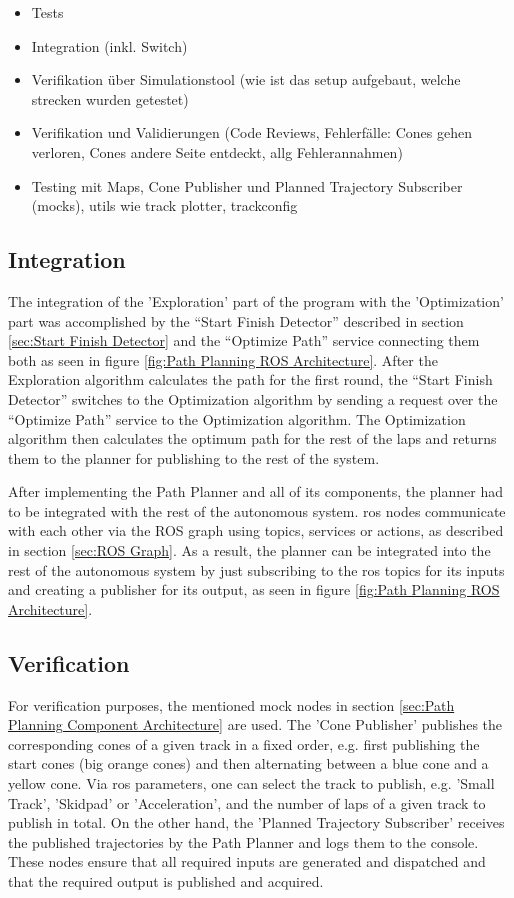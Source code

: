 \begin{itemize}
    \item Tests
    \item Integration (inkl. Switch)
    \item Verifikation über Simulationstool (wie ist das setup aufgebaut, welche strecken wurden getestet)
    \item Verifikation und Validierungen (Code Reviews, Fehlerfälle: Cones gehen verloren, Cones andere Seite entdeckt, allg Fehlerannahmen)
    \item Testing mit Maps, Cone Publisher und Planned Trajectory Subscriber (mocks), utils wie track plotter, trackconfig
\end{itemize}

\subsection{Integration} \label{sec:Integration}
The integration of the 'Exploration' part of the program with the 'Optimization' part was accomplished by the ``Start Finish Detector'' described in section \ref{sec:Start Finish Detector} and the ``Optimize Path'' service connecting them both as seen in figure \ref{fig:Path Planning ROS Architecture}. After the Exploration algorithm calculates the path for the first round, the ``Start Finish Detector'' switches to the Optimization algorithm by sending a request over the ``Optimize Path'' service to the Optimization algorithm. The Optimization algorithm then calculates the optimum path for the rest of the laps and returns them to the planner for publishing to the rest of the system.

After implementing the Path Planner and all of its components, the planner had to be integrated with the rest of the autonomous system.
\acrshort{ros} nodes communicate with each other via the ROS graph using topics, services or actions, as described in section \ref{sec:ROS Graph}. As a result, the planner can be integrated into the rest of the autonomous system by just subscribing to the \acrshort{ros} topics for its inputs and creating a publisher for its output, as seen in figure \ref{fig:Path Planning ROS Architecture}.

\subsection{Verification} \label{sec:Verification}
For verification purposes, the mentioned mock nodes in section \ref{sec:Path Planning Component Architecture} are used. The 'Cone Publisher' publishes the corresponding cones of a given track in a fixed order, e.g. first publishing the start cones (big orange cones) and then alternating between a blue cone and a yellow cone. Via \acrshort{ros} parameters, one can select the track to publish, e.g. 'Small Track', 'Skidpad' or 'Acceleration', and the number of laps of a given track to publish in total. On the other hand, the 'Planned Trajectory Subscriber' receives the published trajectories by the Path Planner and logs them to the console. These nodes ensure that all required inputs are generated and dispatched and that the required output is published and acquired.

